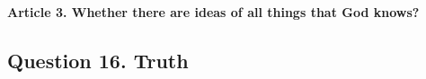 \documentclass{ucetd}
\begin{document}
\paragraph{Article 3. Whether there are ideas of all things that God knows?}


\subsection{Question 16. Truth}
\end{document}
